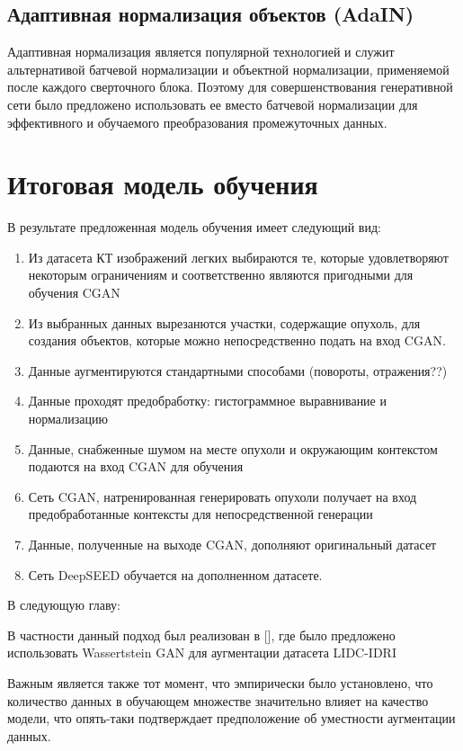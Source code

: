 \subsection{Адаптивная нормализация объектов (AdaIN)}

Адаптивная нормализация является популярной технологией и служит альтернативой батчевой нормализации и объектной нормализации, применяемой после каждого сверточного блока. Поэтому для совершенствования генеративной сети было предложено использовать ее вместо батчевой нормализации для эффективного и обучаемого преобразования промежуточных данных.

\section{Итоговая модель обучения}

В результате предложенная модель обучения имеет следующий вид:

\begin{enumerate}
    \item Из датасета КТ изображений легких выбираются те, которые удовлетворяют некоторым ограничениям и соответственно являются пригодными для обучения CGAN
    \item Из выбранных данных вырезанются участки, содержащие опухоль, для создания объектов, которые можно непосредственно подать на вход CGAN.
    \item Данные аугментируются стандартными способами (повороты, отражения??)
    \item Данные проходят предобработку: гистограммное выравнивание и нормализацию
    \item Данные, снабженные шумом на месте опухоли и окружающим контекстом подаются на вход CGAN для обучения
    \item Сеть CGAN, натренированная генерировать опухоли получает на вход предобработанные контексты для непосредственной генерации
    \item Данные, полученные на выходе CGAN, дополняют оригинальный датасет
    \item Сеть DeepSEED обучается на дополненном датасете.
\end{enumerate}

В следующую главу:

 В частности данный подход был реализован в [], где было предложено использовать Wassertstein GAN для аугментации датасета LIDC-IDRI

Важным является также тот момент, что эмпирически было установлено, что количество данных в обучающем множестве значительно влияет на качество модели, что опять-таки подтверждает предположение об уместности аугментации данных.


